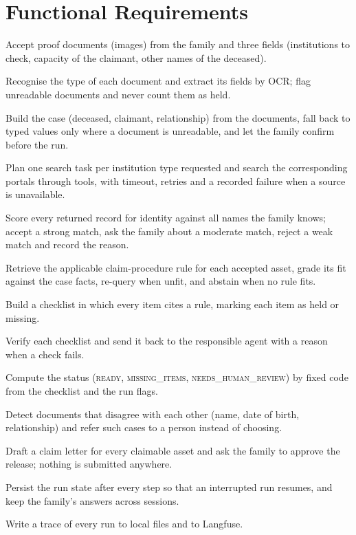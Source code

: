 \documentclass[12pt,a4paper,oneside]{report}
\begin{document}
\section{Functional Requirements}
\begin{description}[leftmargin=1.2cm,labelwidth=1.1cm,itemsep=2pt]
\item[FR1] Accept proof documents (images) from the family and three fields (institutions to check, capacity of the claimant, other names of the deceased).
\item[FR2] Recognise the type of each document and extract its fields by OCR; flag unreadable documents and never count them as held.
\item[FR3] Build the case (deceased, claimant, relationship) from the documents, fall back to typed values only where a document is unreadable, and let the family confirm before the run.
\item[FR4] Plan one search task per institution type requested and search the corresponding portals through tools, with timeout, retries and a recorded failure when a source is unavailable.
\item[FR5] Score every returned record for identity against all names the family knows; accept a strong match, ask the family about a moderate match, reject a weak match and record the reason.
\item[FR6] Retrieve the applicable claim-procedure rule for each accepted asset, grade its fit against the case facts, re-query when unfit, and abstain when no rule fits.
\item[FR7] Build a checklist in which every item cites a rule, marking each item as held or missing.
\item[FR8] Verify each checklist and send it back to the responsible agent with a reason when a check fails.
\item[FR9] Compute the status (\textsc{ready}, \textsc{missing\_items}, \textsc{needs\_human\_review}) by fixed code from the checklist and the run flags.
\item[FR10] Detect documents that disagree with each other (name, date of birth, relationship) and refer such cases to a person instead of choosing.
\item[FR11] Draft a claim letter for every claimable asset and ask the family to approve the release; nothing is submitted anywhere.
\item[FR12] Persist the run state after every step so that an interrupted run resumes, and keep the family's answers across sessions.
\item[FR13] Write a trace of every run to local files and to Langfuse.
\end{description}
\end{document}
